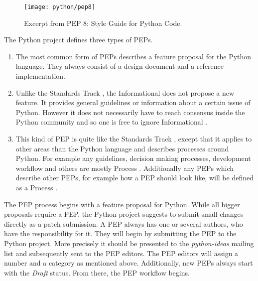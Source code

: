 \begin{figure}[htbp]
  \centering
  \texttt{[image: python/pep8]}
  \caption[Excerpt from \acl{PEP} 8]{Excerpt from \ac{PEP} 8: Style Guide for Python Code.}
\end{figure}

The Python project defines three types of \acp{PEP}.

\begin{enumerate}

  \item {} The most common form of
    \acp{PEP} describes a feature proposal for the Python language. They always
    consist of a design document and a reference implementation.

  \item {} Unlike the Standards Track
    , the Informational  does not propose a
    new feature. It provides general guidelines or information about a certain
    issue of Python. However it does not necessarily have to reach consensus
    inside the Python community and so one is free to ignore Informational
    .

  \item {} This kind of \ac{PEP} is quite like
    the Standards Track , except that it applies to other
    areas than the Python language and describes processes around Python. For
    example any guidelines, decision making processes, development workflow and
    others are mostly Process . Additionally any \acp{PEP}
    which describe other \acp{PEP}, for example how a \ac{PEP} should look
    like, will be defined as a Process .

\end{enumerate}

The \ac{PEP} process begins with a feature proposal for Python. While all
bigger proposals require a \ac{PEP}, the Python project suggests to submit
small changes directly as a patch submission. A \ac{PEP} always has one or
several authors, who have the responsibility for it. They will begin by
submitting the \ac{PEP} to the Python project. More precisely it should be
presented to the \emph{python-ideas} mailing list and subsequently sent to the
\ac{PEP} editors. The \ac{PEP} editors will assign a number and a category as
mentioned above. Additionally, new \acp{PEP} always start with the \emph{Draft}
status. From there, the \ac{PEP} workflow begins.

